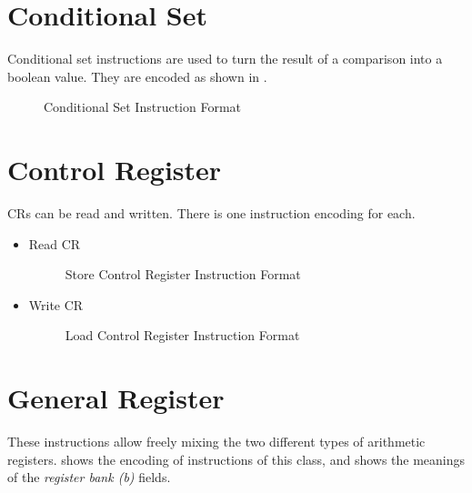 \section{Conditional Set}

Conditional set instructions are used to turn the result of a
comparison into a boolean value.  They are encoded as shown in
.

\begin{figure}[h!]
  \centering
{}\usebox{\ctypebox}
    \caption{Conditional Set Instruction Format}
    \label{fig:conditional-set-format}
\end{figure}

\section{Control Register}

\acp{CR} can be read and written.  There is one instruction encoding
for each.

\begin{itemize}
\item Read \ac{CR}

  \begin{figure}[H]
    \centering
    \lcrbox\usebox{\lcrtypebox}     %
    \caption{Store Control Register Instruction Format}
    \label{fig:store-control-register-format}
  \end{figure}

\item Write \ac{CR}

  \begin{figure}[h!]
    \centering
      \scrbox\usebox{\scrtypebox}     %
      \caption{Load Control Register Instruction Format}
      \label{fig:load-control-register-format}
  \end{figure}
\end{itemize}




\section{General Register}

These instructions allow freely mixing the two different types of
arithmetic registers.   shows the
encoding of instructions of this class, and 
shows the meanings of the \emph{register bank (b)} fields.

